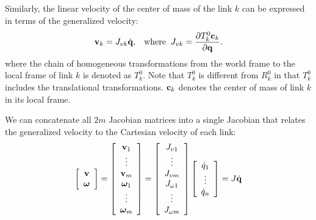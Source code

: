 
Similarly, the linear velocity of the center of mass of the link $k$
can be expressed in terms of the generalized velocity: 
\begin{equation}
\label{eq:linear_velocity_link}
\mathbf{v}_k = J_{vk} \dot{\mathbf{q}}, \;\;\;\mathrm{where}\;\; J_{vk} = \frac{\partial T^0_k
  \mathbf{c}_k}{\partial \mathbf{q}}.
\end{equation}
where the chain of homogeneous transformations from the world frame to the local
frame of link $k$ is denoted as $T^0_k$. Note that $T^0_k$ is
different from $R^0_k$ in that $T^0_k$ includes the translational
transformations. $\mathbf{c}_k$ denotes the center of mass of link $k$ in
its local frame.


We can concatenate all $2m$  Jacobian matrices into a single Jacobian
that relates the generalized velocity to the Cartesian velocity of each
link:
\begin{equation}
\left[
\begin{array}{c}
\mathbf{v} \\
\bm{\omega} \\
\end{array}
\right] =
\left[
\begin{array}{c}
\mathbf{v}_1 \\
\vdots \\
\mathbf{v}_m \\
\bm{\omega}_1 \\
\vdots \\
\bm{\omega}_m
\end{array}
\right] = 
\left[
\begin{array}{c}
J_{v1} \\
\vdots \\
J_{vm} \\
J_{\omega 1} \\
\vdots \\
J_{\omega m}
\end{array}
\right] 
\left[
\begin{array}{c}
\dot{q}_1\\
\vdots \\
\dot{q}_n
\end{array}
\right]  = J \dot{\mathbf{q}}
\end{equation}

